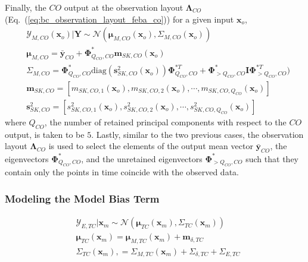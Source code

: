 Finally, the $CO$ output at the observation layout $\boldsymbol{\Lambda}_{CO}$ (Eq.~(\ref{eq:bc_observation_layout_feba_co})) for a given input $\bm{x}_o$,
\begin{equation}
	\begin{split}
		& \bm{\mathcal{Y}}_{M,CO} (\bm{x}_o) | \mathbf{Y} \sim \mathcal{N} (\boldsymbol{\mu}_{M,CO} (\bm{x}_o), \Sigma_{M,CO} (\bm{x}_o)) \\
		& \boldsymbol{\mu}_{M,CO}  = \bar{\mathbf{y}}_{CO} + \boldsymbol{\Phi}^*_{Q_{CO},CO} \mathbf{m}_{SK,CO}(\bm{x}_o) \\
		& \Sigma_{M,CO} = \boldsymbol{\Phi}^*_{Q_{CO},CO} \text{diag}(\mathbf{s}^2_{SK,CO}(\bm{x}_o)) \boldsymbol{\Phi}^{*T}_{Q_{CO},CO} + \boldsymbol{\Phi}^*_{>Q_{CO},CO} \mathbf{I}\boldsymbol{\Phi}^{*T}_{>Q_{CO},CO}) \\
		& \mathbf{m}_{SK,CO} = [m_{SK,CO,1}(\bm{x}_o), m_{SK,CO,2}(\bm{x}_o), \cdots, m_{SK,CO,Q_{CO}}(\bm{x}_o)] \\
		& \mathbf{s}^2_{SK,CO} = [s^2_{SK,CO,1}(\bm{x}_o), s^2_{SK,CO,2}(\bm{x}_o), \cdots, s^2_{SK,CO,Q_{CO}}(\bm{x}_o)]
	\end{split}
\label{eq:p_variate_metamodel_co}
\end{equation}
where $Q_{CO}$, the number of retained principal components with respect to the $CO$ output, is taken to be $5$.
Lastly, similar to the two previous cases, the observation layout $\boldsymbol{\Lambda}_{CO}$ is used to select the elements of the output mean vector $\bar{\mathbf{y}}_{CO}$, the eigenvectors $\boldsymbol{\Phi}^*_{Q_{CO},CO}$, and the unretained eigenvectors $\boldsymbol{\Phi}^*_{>Q_{CO},CO}$ such that they contain only the points in time coincide with the observed data.

\subsubsection{Modeling the Model Bias Term}\label{subsub:bc_model_bias}




\begin{equation}
	\begin{split}
		& \bm{\mathcal{Y}}_{E,TC} | \mathbf{x}_m \sim \mathcal{N} (\boldsymbol{\mu}_{TC} (\bm{x}_m), \Sigma_{TC} (\bm{x}_m)) \\
		& \boldsymbol{\mu}_{TC} (\bm{x}_m) = \boldsymbol{\mu}_{M,TC} (\bm{x}_m) + \mathbf{m}_{\delta,TC} \\
		& \Sigma_{TC} (\bm{x}_m), = \Sigma_{M,TC} (\bm{x}_m) + \Sigma_{\delta,TC} + \Sigma_{E,TC} \\
	\end{split}
\label{eq:feba_gp_bias}
\end{equation}


